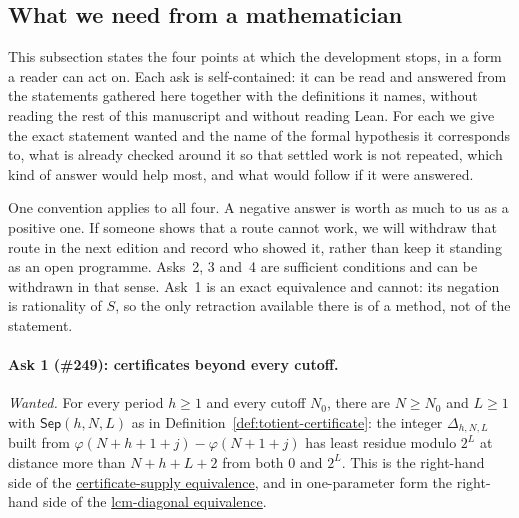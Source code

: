 \documentclass[11pt]{article}
\newcommand{\commit}{99f4bf47422abbd8757cbb22b50ba079d764d3a7}
\newcommand{\repobase}{https://github.com/wcook04/plectis-erdos/blob/\commit}
\newcommand{\PK}{Erdos249257}
\newcommand{\lword}[4]{\href{\repobase/\PK/#1\#L#2}{#4}}
\theoremstyle{definition}
\theoremstyle{remark}
\newcommand{\ph}{\varphi}
\begin{document}
\subsection{What we need from a mathematician}\label{sec:asks}

This subsection states the four points at which the development stops, in a
form a reader can act on.  Each ask is self-contained: it can be read and
answered from the statements gathered here together with the definitions it
names, without reading the rest of this manuscript and without reading Lean.
For each we give the exact statement wanted and the name of the formal
hypothesis it corresponds to, what is already checked around it so that
settled work is not repeated, which kind of answer would help most, and what
would follow if it were answered.

One convention applies to all four.  A negative answer is worth as much to us
as a positive one.  If someone shows that a route cannot work, we will
withdraw that route in the next edition and record who showed it, rather than
keep it standing as an open programme.  Asks~2, 3 and~4 are sufficient
conditions and can be withdrawn in that sense.  Ask~1 is an exact
equivalence and cannot: its negation is rationality of \(S\), so the only
retraction available there is of a method, not of the statement.

\paragraph{Ask 1 (\#249): certificates beyond every cutoff.}
\emph{Wanted.}  For every period \(h\ge1\) and every cutoff \(N_0\), there
are \(N\ge N_0\) and \(L\ge1\) with \(\mathsf{Sep}(h,N,L)\) as in
Definition~\ref{def:totient-certificate}: the integer \(\Delta_{h,N,L}\)
built from \(\ph(N{+}h{+}1{+}j)-\ph(N{+}1{+}j)\) has least residue modulo
\(2^L\) at distance more than \(N+h+L+2\) from both \(0\) and \(2^L\).  This
is the right-hand side of the
\lword{LcmConeFlatness.lean}{412}{irrational_totient_series_iff_certificate_supply}{certificate-supply equivalence},
and in one-parameter form the right-hand side of the
\lword{LcmConeFlatness.lean}{426}{irrational_totient_series_iff_lcm_diagonal_certificate_supply}{lcm-diagonal equivalence}.
\end{document}
